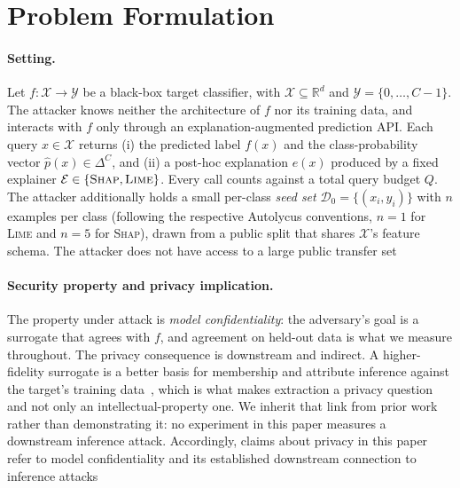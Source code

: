 \documentclass[sigconf,anonymous,review]{acmart}
\begin{document}
\section{Problem Formulation}
\label{sec:problem}

\paragraph{Setting.}
Let $f : \mathcal{X} \to \mathcal{Y}$ be a black-box target classifier, with
$\mathcal{X} \subseteq \mathbb{R}^d$ and $\mathcal{Y} = \{0, \ldots, C{-}1\}$.
The attacker knows neither the architecture of $f$ nor its training data, and interacts
with $f$ only through an explanation-augmented prediction API.
Each query $x \in \mathcal{X}$ returns (i) the predicted label $f(x)$ and the
class-probability vector $\hat{p}(x) \in \Delta^{C}$, and (ii) a post-hoc
explanation $e(x)$ produced by a fixed explainer
$\mathcal{E} \in \{\textsc{Shap}, \textsc{Lime}\}$.
Every call counts against a total query budget $Q$.
The attacker additionally holds a small per-class \emph{seed set}
$\mathcal{D}_{0} = \{(x_i, y_i)\}$ with $n$ examples per class (following the respective
Autolycus conventions, $n{=}1$ for \textsc{Lime} and $n{=}5$ for \textsc{Shap}), drawn from a
public split that shares $\mathcal{X}$'s feature schema. The attacker does not have access to a large public transfer set

\paragraph{Security property and privacy implication.}
The property under attack is \emph{model confidentiality}: the adversary's goal is a surrogate that
agrees with $f$, and agreement on held-out data is what we measure throughout. The privacy
consequence is downstream and indirect. A higher-fidelity surrogate is a better basis for
membership and attribute inference against the target's training
data~\cite{oksuz2026lomime,nguyen2024survey}, which is what makes
extraction a privacy question and not only an intellectual-property one. We inherit that link from
prior work rather than demonstrating it: no experiment in this paper measures a downstream inference
attack. Accordingly, claims about privacy in this paper refer to model confidentiality and its established downstream connection to inference attacks
\end{document}

